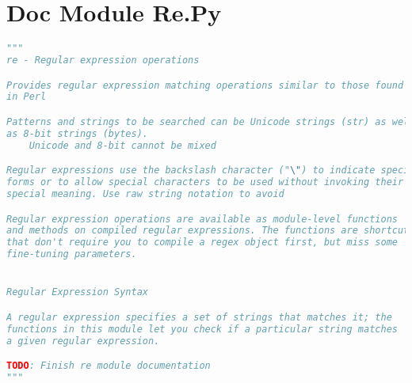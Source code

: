 \documentclass[a4paper,landscape]{report}
\begin{document}
\section{Doc Module Re.Py}
\begin{lstlisting}[language=Python]
"""
re - Regular expression operations

Provides regular expression matching operations similar to those found
in Perl

Patterns and strings to be searched can be Unicode strings (str) as well
as 8-bit strings (bytes).
    Unicode and 8-bit cannot be mixed

Regular expressions use the backslash character ("\") to indicate special
forms or to allow special characters to be used without invoking their
special meaning. Use raw string notation to avoid

Regular expression operations are available as module-level functions
and methods on compiled regular expressions. The functions are shortcuts
that don't require you to compile a regex object first, but miss some
fine-tuning parameters.


Regular Expression Syntax

A regular expression specifies a set of strings that matches it; the
functions in this module let you check if a particular string matches
a given regular expression.

TODO: Finish re module documentation
"""
\end{lstlisting}
\end{document}

